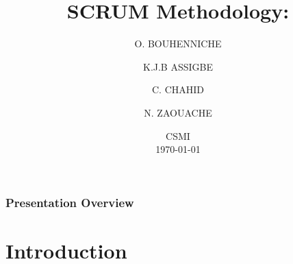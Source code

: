 \documentclass[
	11pt, %
]{beamer}
\title[Scrum Methodology]{ \textbf{SCRUM Methodology:} \\ \text{Team\_SCRUM}} %
\author[BOUHENNICHE \and ASSIGBE  \and RAHOUTI \and ZAOUACHE ]{O. BOUHENNICHE \and K.J.B ASSIGBE \and C. CHAHID \and N. ZAOUACHE} %
\institute[]{University of Strasbourg } %
\date[\today]{ CSMI \\ \today} %
\begin{document}

\begin{frame}
	\titlepage %
\end{frame}



\begin{frame}
	\frametitle{Presentation Overview} %

	\tableofcontents %
\end{frame}


\section{Introduction} %
\end{document}
